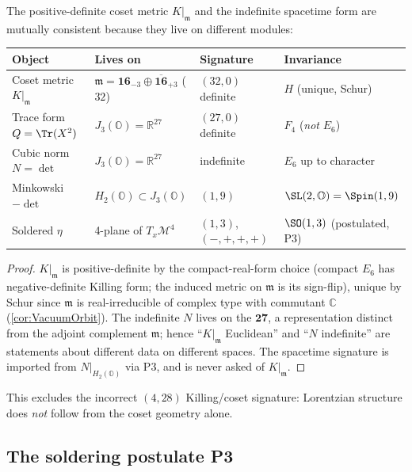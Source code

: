 \begin{theorem}
\label{thm:spacetime:consistent}
The positive-definite coset metric $K|_{\mathfrak m}$ and the indefinite spacetime
form are mutually consistent because they live on different modules:
\begin{center}\renewcommand{\arraystretch}{1.25}
\begin{tabular}{@{}llll@{}}
\toprule
Object & Lives on & Signature & Invariance \\
\midrule
Coset metric $K|_{\mathfrak m}$ & $\mathfrak m=\mathbf{16}_{-3}\oplus\overline{\mathbf{16}}_{+3}$ ($32$) & $(32,0)$ definite & $H$ (unique, Schur)\\
Trace form $Q=\Tr(X^2)$ & $J_3(\mathbb O)=\mathbb R^{27}$ & $(27,0)$ definite & $F_4$ (\emph{not} $E_6$)\\
Cubic norm $N=\det$ & $J_3(\mathbb O)=\mathbb R^{27}$ & indefinite & $E_6$ up to character\\
Minkowski $-\det$ & $H_2(\mathbb O)\subset J_3(\mathbb O)$ & $(1,9)$ & $\SL(2,\mathbb O)=\Spin(1,9)$\\
Soldered $\eta$ & 4-plane of $T_x\mathcal M^4$ & $(1,3)$, $(-,+,+,+)$ & $\SO(1,3)$ (postulated, P3)\\
\bottomrule
\end{tabular}
\end{center}
\end{theorem}
\begin{proof}
$K|_{\mathfrak m}$ is positive-definite by the compact-real-form choice (compact $E_6$
has negative-definite Killing form; the induced metric on $\mathfrak m$ is its
sign-flip), unique by Schur since $\mathfrak m$ is real-irreducible of complex type with
commutant $\mathbb C$ (\autoref{cor:VacuumOrbit}). The indefinite $N$ lives on the
$\mathbf{27}$, a representation distinct from the adjoint complement $\mathfrak m$;
hence ``$K|_{\mathfrak m}$ Euclidean'' and ``$N$ indefinite'' are statements about
different data on different spaces. The spacetime signature is imported from
$N|_{H_2(\mathbb O)}$ via P3, and is never asked of $K|_{\mathfrak m}$.
\end{proof}

This excludes the incorrect $(4,28)$ Killing/coset signature: Lorentzian structure does
\emph{not} follow from the coset geometry alone.

\subsection{The soldering postulate P3}
\label{sec:spacetime:P3}

